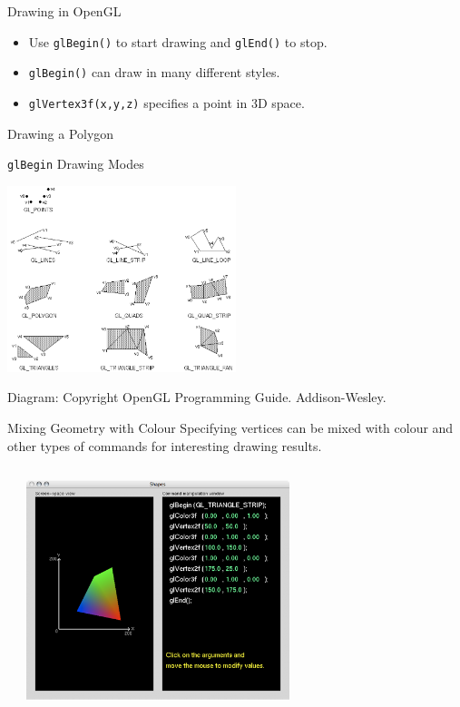 \documentclass[aspectratio=1610,xcolor=dvipsnames,t]{beamer}
\newcommand{\showcode}[1]{\begin{mdframed}[style=code] %
                          \end{mdframed}%
}
\begin{document}
\begin{frame}{Drawing in OpenGL}
    \begin{itemize} 
        \item Use \texttt{glBegin()} to start drawing and \texttt{glEnd()} to stop.
        \item \texttt{glBegin()} can draw in many different styles.
        \item \texttt{glVertex3f(x,y,z)} specifies a point in 3D space.
    \end{itemize} 
    \begin{block}{Drawing a Polygon} 
        \showcode{polygon.c} 
    \end{block} 
\end{frame} 

\begin{frame}{\texttt{glBegin} Drawing Modes}  
    \begin{center} 
         \includegraphics[width=0.5\textwidth]{glbegin} 
    \end{center} 
    \tiny
    Diagram: Copyright OpenGL Programming Guide. Addison-Wesley. 
    \normalsize
\end{frame} 

\begin{frame}{Mixing Geometry with Colour} 
    Specifying vertices can be mixed with colour and other 
    types of commands for interesting drawing results.
    \begin{columns}[t]
        \showcode{geomcolor.c} 
        \begin{center}
            \includegraphics[width=0.6\textwidth]{geom-color} 
        \end{center} 
    \end{columns} 
\end{frame} 
\end{document}
